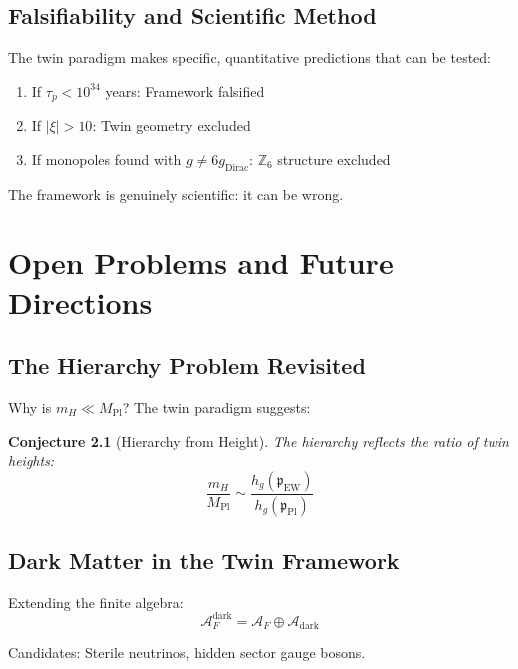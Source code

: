 \documentclass[11pt,a4paper,openright]{book}
\theoremstyle{plain}
\newtheorem{conjecture}[theorem]{Conjecture}
\theoremstyle{definition}
\newcommand{\A}{\mathcal{A}}
\newcommand{\Pl}{\mathrm{Pl}}
\newcommand{\Z}{\mathbb{Z}}
\newcommand{\MPl}{M_{\mathrm{Pl}}}
\begin{document}
\section{Falsifiability and Scientific Method}

The twin paradigm makes specific, quantitative predictions that can be tested:

\begin{enumerate}
    \item If $\tau_p < 10^{34}$ years: Framework falsified
    \item If $|\xi| > 10$: Twin geometry excluded
    \item If monopoles found with $g \neq 6g_{\mathrm{Dirac}}$: $\Z_6$ structure excluded
\end{enumerate}

The framework is genuinely scientific: it can be wrong.

\chapter{Open Problems and Future Directions}
\label{ch:open}

\section{The Hierarchy Problem Revisited}

Why is $m_H \ll \MPl$? The twin paradigm suggests:

\begin{conjecture}[Hierarchy from Height]
The hierarchy reflects the ratio of twin heights:
\begin{equation}
\frac{m_H}{\MPl} \sim \frac{h_g(\mathfrak{p}_{\mathrm{EW}})}{h_g(\mathfrak{p}_{\Pl})}
\end{equation}
\end{conjecture}

\section{Dark Matter in the Twin Framework}

Extending the finite algebra:
\begin{equation}
\A_F^{\mathrm{dark}} = \A_F \oplus \A_{\mathrm{dark}}
\end{equation}

Candidates: Sterile neutrinos, hidden sector gauge bosons.
\end{document}
